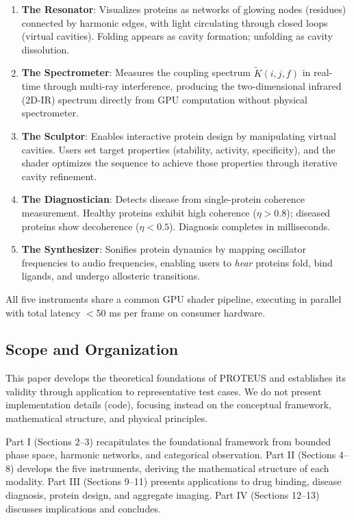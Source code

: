\documentclass[11pt,a4paper]{article}
\begin{document}
\begin{enumerate}
\item \textbf{The Resonator}: Visualizes proteins as networks of glowing nodes (residues) connected by harmonic edges, with light circulating through closed loops (virtual cavities). Folding appears as cavity formation; unfolding as cavity dissolution.

\item \textbf{The Spectrometer}: Measures the coupling spectrum $\tilde{K}(i,j,f)$ in real-time through multi-ray interference, producing the two-dimensional infrared (2D-IR) spectrum directly from GPU computation without physical spectrometer.

\item \textbf{The Sculptor}: Enables interactive protein design by manipulating virtual cavities. Users set target properties (stability, activity, specificity), and the shader optimizes the sequence to achieve those properties through iterative cavity refinement.

\item \textbf{The Diagnostician}: Detects disease from single-protein coherence measurement. Healthy proteins exhibit high coherence ($\eta > 0.8$); diseased proteins show decoherence ($\eta < 0.5$). Diagnosis completes in milliseconds.

\item \textbf{The Synthesizer}: Sonifies protein dynamics by mapping oscillator frequencies to audio frequencies, enabling users to \textit{hear} proteins fold, bind ligands, and undergo allosteric transitions.
\end{enumerate}

All five instruments share a common GPU shader pipeline, executing in parallel with total latency $<$50 ms per frame on consumer hardware.

\subsection{Scope and Organization}

This paper develops the theoretical foundations of PROTEUS and establishes its validity through application to representative test cases. We do not present implementation details (code), focusing instead on the conceptual framework, mathematical structure, and physical principles.

Part I (Sections 2--3) recapitulates the foundational framework from bounded phase space, harmonic networks, and categorical observation. Part II (Sections 4--8) develops the five instruments, deriving the mathematical structure of each modality. Part III (Sections 9--11) presents applications to drug binding, disease diagnosis, protein design, and aggregate imaging. Part IV (Sections 12--13) discusses implications and concludes.
\end{document}

